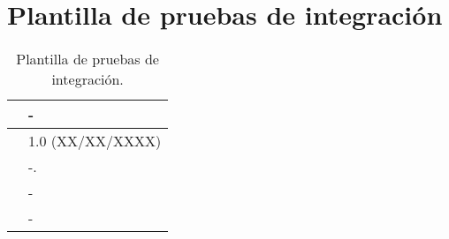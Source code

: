\section{Plantilla de pruebas de integración}

\begin{table}[H]
\begin{center}
\begin{tabular}{|p{3cm}|p{10cm}|} \hline
\centering {\bf PI-XX} & -  \\ \hline\hline
\centering {\bf Versión} & 1.0 (XX/XX/XXXX) \\ \hline
\centering {\bf Descripción} &  -. \\ \hline
\centering {\bf Criterio de aceptación} & - \\ \hline
\centering {\bf Estado} & - \\ \hline
\end{tabular}
\caption{Plantilla de pruebas de integración.}
\label{enlacePIX}
\end{center}
\end{table}